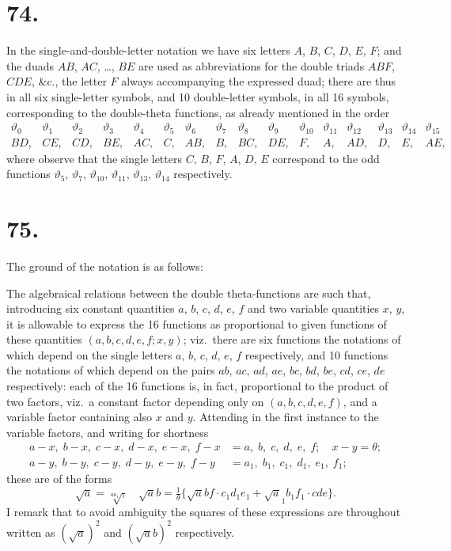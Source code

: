 \documentclass[11pt,a4paper]{article}
\newcommand{\uth}[1]{\vartheta_{#1}}
\begin{document}
\section*{74.}
\label{sec:74}

In the single-and-double-letter notation we have six letters $A$, $B$, $C$, $D$, $E$, $F$; and the duads $AB$, $AC$, \ldots, $BE$ are used as abbreviations for the double triads $ABF$, $CDE$, \&c., the letter $F$ always accompanying the expressed duad; there are thus in all six single-letter symbols, and 10 double-letter symbols, in all 16 symbols, corresponding to the double-theta functions, as already mentioned in the order
\[
\begin{array}{cccccccccccccccc}
\uth{0} & \uth{1} & \uth{2} & \uth{3} & \uth{4} & \uth{5} & \uth{6} & \uth{7} & \uth{8} & \uth{9} & \uth{10} & \uth{11} & \uth{12} & \uth{13} & \uth{14} & \uth{15} \\
BD, & CE, & CD, & BE, & AC, & C, & AB, & B, & BC, & DE, & F, & A, & AD, & D, & E, & AE,
\end{array}
\]
where observe that the single letters $C$, $B$, $F$, $A$, $D$, $E$ correspond to the odd functions $\uth{5}$, $\uth{7}$, $\uth{10}$, $\uth{11}$, $\uth{13}$, $\uth{14}$ respectively.

\section*{75.}
\label{sec:75}

The ground of the notation is as follows:

The algebraical relations between the double theta-functions are such that, introducing six constant quantities $a$, $b$, $c$, $d$, $e$, $f$ and two variable quantities $x$, $y$, it is allowable to express the 16 functions as proportional to given functions of these quantities $(a,b,c,d,e,f; x,y)$; viz.\ there are six functions the notations of which depend on the single letters $a$, $b$, $c$, $d$, $e$, $f$ respectively, and 10 functions the notations of which depend on the pairs $ab$, $ac$, $ad$, $ae$, $bc$, $bd$, $be$, $cd$, $ce$, $de$ respectively: each of the 16 functions is, in fact, proportional to the product of two factors, viz.\ a constant factor depending only on $(a,b,c,d,e,f)$, and a variable factor containing also $x$ and $y$. Attending in the first instance to the variable factors, and writing for shortness
\begin{align*}
a-x,\; b-x,\; c-x,\; d-x,\; e-x,\; f-x &= a,\; b,\; c,\; d,\; e,\; f;\quad x-y=\theta; \\
a-y,\; b-y,\; c-y,\; d-y,\; e-y,\; f-y &= a_1,\; b_1,\; c_1,\; d_1,\; e_1,\; f_1;
\end{align*}
these are of the forms
\[
\surd a = \surd[aa_1], \quad \surd ab = \tfrac{1}{\theta}\{\surd abf \cdot c_1d_1e_1 + \surd a_1b_1f_1 \cdot cde\}.
\]
I remark that to avoid ambiguity the squares of these expressions are throughout written as $(\surd a)^2$ and $(\surd ab)^2$ respectively.
\end{document}
